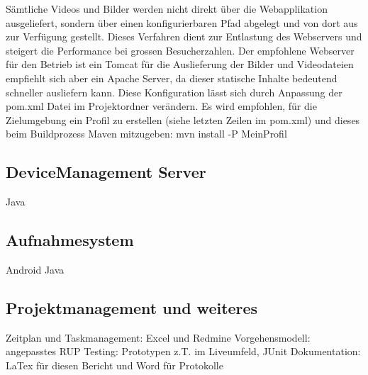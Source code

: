 Sämtliche Videos und Bilder werden nicht direkt über die Webapplikation ausgeliefert, sondern über einen konfigurierbaren Pfad abgelegt und von dort aus zur Verfügung gestellt. Dieses Verfahren dient zur Entlastung des Webservers und steigert die Performance bei grossen Besucherzahlen. Der empfohlene Webserver für den Betrieb ist ein Tomcat für die Auslieferung der Bilder und Videodateien empfiehlt sich aber ein Apache Server, da dieser statische Inhalte bedeutend schneller ausliefern kann.
Diese Konfiguration lässt sich durch Anpassung der pom.xml Datei im Projektordner verändern. Es wird empfohlen, für die Zielumgebung ein Profil zu erstellen (siehe letzten Zeilen im pom.xml) und dieses beim Buildprozess Maven mitzugeben:
mvn install -P MeinProfil

\subsection{DeviceManagement Server}
Java

\subsection{Aufnahmesystem}
Android Java

\subsection{Projektmanagement und weiteres}
Zeitplan und Taskmanagement: Excel und Redmine
Vorgehensmodell: angepasstes RUP
Testing: Prototypen z.T. im Liveumfeld, JUnit
Dokumentation: LaTex für diesen Bericht und Word für Protokolle